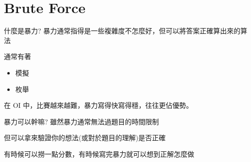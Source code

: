 
\section{Brute Force}

\begin{frame}{什麼是暴力?}
    暴力通常指得是一些複雜度不怎麼好，但可以將答案正確算出來的算法

    通常有著

    \begin{itemize}
        \item 模擬
        \item 枚舉
    \end{itemize}\pause

    在 OI 中，比賽越來越難，暴力寫得快寫得穩，往往更佔優勢。
\end{frame}

\begin{frame}{暴力可以幹嘛?}
    雖然暴力通常無法過題目的時間限制

    但可以拿來驗證你的想法(或對於題目的理解)是否正確

    有時候可以撈一點分數，有時候寫完暴力就可以想到正解怎麼做
\end{frame}